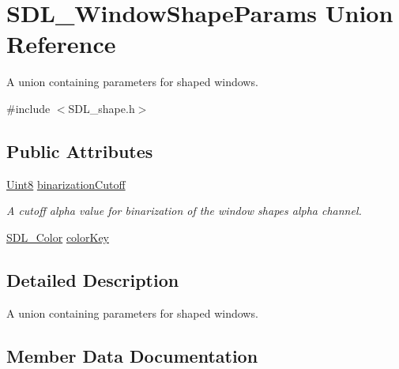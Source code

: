 \hypertarget{union_s_d_l___window_shape_params}{}\section{S\+D\+L\+\_\+\+Window\+Shape\+Params Union Reference}
\label{union_s_d_l___window_shape_params}


A union containing parameters for shaped windows.  




{\ttfamily \#include $<$S\+D\+L\+\_\+shape.\+h$>$}

\subsection*{Public Attributes}
\begin{DoxyCompactItemize}
\item 
\mbox{\hyperlink{_s_d_l__stdinc_8h_a2944638813a090aa23e62f4da842c3e2}{Uint8}} \mbox{\hyperlink{union_s_d_l___window_shape_params_a534c40b09588a8075c0a70227753dc56}{binarization\+Cutoff}}
\begin{DoxyCompactList}\small\item\em A cutoff alpha value for binarization of the window shape\textquotesingle{}s alpha channel. \end{DoxyCompactList}\item 
\mbox{\hyperlink{struct_s_d_l___color}{S\+D\+L\+\_\+\+Color}} \mbox{\hyperlink{union_s_d_l___window_shape_params_a8bf3e442a51a1bbf452cfec7c1ed5318}{color\+Key}}
\end{DoxyCompactItemize}


\subsection{Detailed Description}
A union containing parameters for shaped windows. 

\subsection{Member Data Documentation}
\mbox{\label{union_s_d_l___window_shape_params_a534c40b09588a8075c0a70227753dc56}} 
